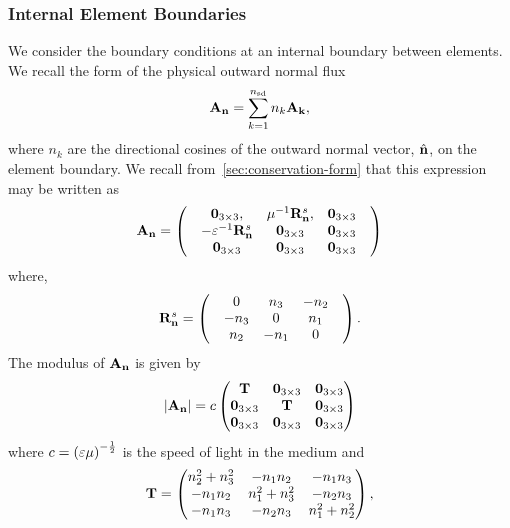 
\subsubsection{Internal Element Boundaries}
We consider the boundary conditions at an internal boundary between elements. We recall the form of the physical outward normal flux
$$\mathbf{A}_\mathbf{n} = \sum_{k=1}^{n_\textrm{sd}} n_{k} \mathbf{A}_\mathbf{k} ,$$
where $n_k$ are the directional cosines of the outward normal vector, $\hat{\mathbf{n}}$, on the element boundary. We recall from~\ref{sec:conservation-form} that this expression may be written as
$$
  \mathbf{A}_\mathbf{n} =
  \begin{pmatrix}
 & \mathbf{0}_{3\times3} , & \mu^{-1} \mathbf{R}^{s}_{\mathbf{n}}, & \mathbf{0}_{3\times3} \\
 & - \varepsilon^{-1} \mathbf{R}^{s}_{\mathbf{n}} & \mathbf{0}_{3\times3} & \mathbf{0}_{3\times3} \\
 & \mathbf{0}_{3\times3} & \mathbf{0}_{3\times3} & \mathbf{0}_{3\times3} 
 & \end{pmatrix}
$$
where,
$$
  \mathbf{R}^{s}_{\mathbf{n}} =
  \begin{pmatrix}
 & 0 & n_3 & -n_2 \\
 & -n_3 & 0 & n_1 \\
& n_2 & -n_1 & 0 
 & \end{pmatrix} .
$$
The modulus of $\mathbf{A}_\mathbf{n}$ is given by
\begin{align*}
\left| \mathbf{A}_\mathbf{n} \right| = c
\begin{pmatrix}
  \mathbf{T} & \mathbf{0}_{3\times3} & \mathbf{0}_{3\times3} \\
  \mathbf{0}_{3\times3}  & \mathbf{T} & \mathbf{0}_{3\times3} \\
   \mathbf{0}_{3\times3} & \mathbf{0}_{3\times3} & \mathbf{0}_{3\times3} 
\end{pmatrix}
\end{align*}
where $c = \left( \varepsilon \mu  \right)^{-\frac{1}{2}}$ is the speed of light in the medium and
\begin{align*}
  \mathbf{T} = 
\begin{pmatrix}
n_2^2 + n_3^2 &      -n_1 n_2 &      -n_1 n_3 \\
-n_1 n_2 & n_1^2 + n_3^2 &      -n_2 n_3 \\
-n_1 n_3 &      -n_2 n_3 & n_1^2 + n_2^2 \\
\end{pmatrix} ,
\end{align*}
